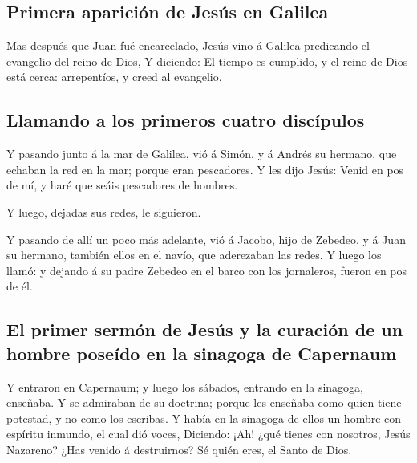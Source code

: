 \hypertarget{primera-apariciuxf3n-de-jesuxfas-en-galilea}{%
\subsection{Primera aparición de Jesús en
Galilea}\label{primera-apariciuxf3n-de-jesuxfas-en-galilea}}

 Mas después que Juan fué encarcelado, Jesús vino á
Galilea predicando el evangelio del reino de Dios,  Y
diciendo: El tiempo es cumplido, y el reino de Dios está cerca:
arrepentíos, y creed al evangelio.

\hypertarget{llamando-a-los-primeros-cuatro-discuxedpulos}{%
\subsection{Llamando a los primeros cuatro
discípulos}\label{llamando-a-los-primeros-cuatro-discuxedpulos}}

 Y pasando junto á la mar de Galilea, vió á Simón, y á
Andrés su hermano, que echaban la red en la mar; porque eran pescadores.
 Y les dijo Jesús: Venid en pos de mí, y haré que seáis
pescadores de hombres.

 Y luego, dejadas sus redes, le siguieron.

 Y pasando de allí un poco más adelante, vió á Jacobo,
hijo de Zebedeo, y á Juan su hermano, también ellos en el navío, que
aderezaban las redes.  Y luego los llamó: y dejando á su
padre Zebedeo en el barco con los jornaleros, fueron en pos de él.

\hypertarget{el-primer-sermuxf3n-de-jesuxfas-y-la-curaciuxf3n-de-un-hombre-poseuxeddo-en-la-sinagoga-de-capernaum}{%
\subsection{El primer sermón de Jesús y la curación de un hombre poseído
en la sinagoga de
Capernaum}\label{el-primer-sermuxf3n-de-jesuxfas-y-la-curaciuxf3n-de-un-hombre-poseuxeddo-en-la-sinagoga-de-capernaum}}

 Y entraron en Capernaum; y luego los sábados, entrando
en la sinagoga, enseñaba.  Y se admiraban de su doctrina;
porque les enseñaba como quien tiene potestad, y no como los escribas.
 Y había en la sinagoga de ellos un hombre con espíritu
inmundo, el cual dió voces,  Diciendo: ¡Ah! ¿qué tienes
con nosotros, Jesús Nazareno? ¿Has venido á destruirnos? Sé quién eres,
el Santo de Dios.

